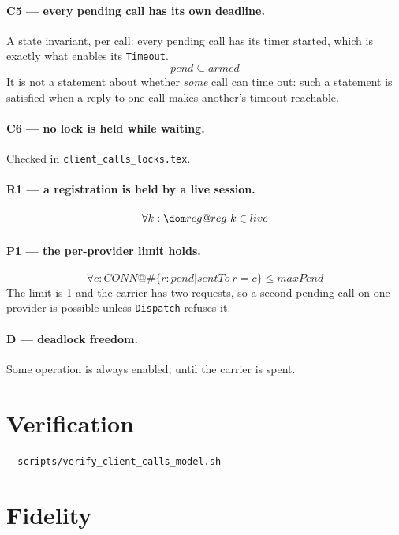 \documentclass[a4paper,10pt,fleqn]{article}
\begin{document}
\paragraph{C5 --- every pending call has its own deadline.}
A state invariant, per call: every pending call has its timer started, which
is exactly what enables its \texttt{Timeout}.
\[
  pend \subseteq armed
\]
It is not a statement about whether \emph{some} call can time out: such a
statement is satisfied when a reply to one call makes another's timeout
reachable.

\paragraph{C6 --- no lock is held while waiting.}
Checked in \texttt{client\_calls\_locks.tex}.

\paragraph{R1 --- a registration is held by a live session.}
\[
  \forall k : \dom reg @ reg~k \in live
\]

\paragraph{P1 --- the per-provider limit holds.}
\[
  \forall c : CONN @ \# \{ r : pend | sentTo~r = c \} \leq maxPend
\]
The limit is 1 and the carrier has two requests, so a second pending call on
one provider is possible unless \texttt{Dispatch} refuses it.

\paragraph{D --- deadlock freedom.}
Some operation is always enabled, until the carrier is spent.

\section{Verification}
\label{sec:verify}

\begin{verbatim}
  scripts/verify_client_calls_model.sh
\end{verbatim}

\section{Fidelity}
\end{document}
